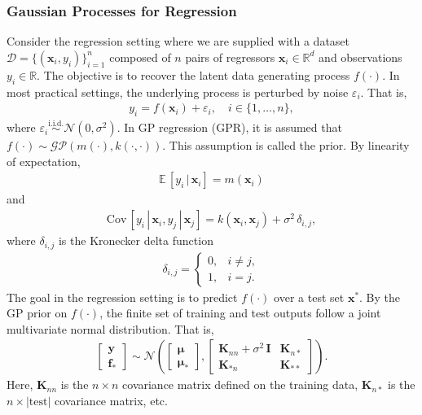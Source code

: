 \documentclass[journal=jacsat,manuscript=article]{achemso}
\newcommand{\reals}{\ensuremath{\mathbb{R}}}
\newcommand{\xvec}{\ensuremath{\mathbf{x}}}
\begin{document}
{\subsubsection{Gaussian Processes for Regression}
Consider the regression setting where we are supplied with a dataset $\mathcal{D} = \{(\xvec_i, y_i)\}_{i=1}^n$ composed of $n$ pairs of regressors $\xvec_i \in \reals^d$ and observations $y_i \in \reals$. The objective is to recover the latent data generating process $f(\cdot)$. In most practical settings, the underlying process is perturbed by noise $\varepsilon_i$. That is,
\begin{gather*}
    y_i = f(\xvec_i) + \varepsilon_i, \quad i \in \{1,\dots, n\},
\end{gather*}
where $\varepsilon_i \stackrel{\text{i.i.d.}}{\sim} \mathcal{N}(0,\sigma^2)$. In GP regression (GPR), it is assumed that $f(\cdot)\sim \mathcal{GP}(m(\cdot),k(\cdot,\cdot))$. This assumption is called the prior. By linearity of expectation,
\begin{gather*}
    \mathbb{E}\,[y_i\,|\,\xvec_i] = m(\xvec_i)
\end{gather*}
and
\begin{gather*}
    \text{Cov}\,[y_i\, | \,\xvec_i, y_j \, | \,\xvec_j] = k(\xvec_i, \xvec_j) + \sigma^2 \,\delta_{i,j},
\end{gather*}
where $\delta_{i,j}$ is the Kronecker delta function
\begin{gather*}
    \delta_{i,j} = 
    \begin{cases}
        0, & i\neq j,\\
        1, & i= j.
    \end{cases}
\end{gather*}
The goal in the regression setting is to predict $f(\cdot)$ over a test set $\xvec^*$. By the GP prior on $f(\cdot)$, the finite set of training and test outputs follow a joint multivariate normal distribution. That is,
\begin{gather*}
    \begin{bmatrix}
        \mathbf{y} \\
        \mathbf{f}_*
    \end{bmatrix}
    \sim 
    \mathcal{N}\left(
    \begin{bmatrix}
        \boldsymbol{\mu}\\
        \boldsymbol{\mu}_*
    \end{bmatrix},
    \begin{bmatrix}
        \mathbf{K}_{nn} +\sigma^2\,\mathbf{I} & \mathbf{K}_{n*} \\
        \mathbf{K}_{*n} & \mathbf{K}_{**}
    \end{bmatrix} \right).
\end{gather*}
Here, $\mathbf{K}_{nn}$ is the $n\times n$ covariance matrix defined on the training data,  $\mathbf{K}_{n*}$ is the $n \times |\text{test}|$ covariance matrix, etc. 

}
\end{document}
